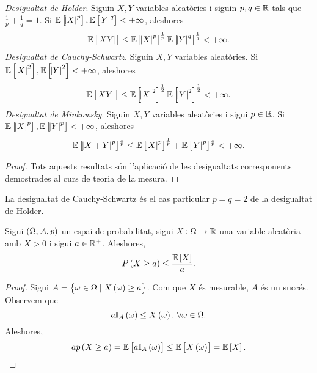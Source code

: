 \begin{prop}
    \textit{Desigualtat de Holder}. Siguin $X,Y$ variables aleatòries i siguin $p,q\in\mathbb{R}$ tals que $\frac{1}{p}+\frac{1}{q}=1$. Si $\operatorname{\mathbb{E}}\left[\abs{X}^p\right],\operatorname{\mathbb{E}}\left[\abs{Y}^q\right]<+\infty$, aleshores
    \[
        \operatorname{\mathbb{E}}\left[\abs{XY}\right]\leq\operatorname{\mathbb{E}}\left[\abs{X}^p\right]^{\frac{1}{p}}\operatorname{\mathbb{E}}\left[\abs{Y}^q\right]^{\frac{1}{q}}<+\infty.
    \]
    \textit{Desigualtat de Cauchy-Schwartz}. Siguin $X,Y$ variables aleatòries. Si $\operatorname{\mathbb{E}}\left[\abs{X}^2\right],\operatorname{\mathbb{E}}\left[\abs{Y}^2\right]<+\infty$, aleshores
    \[
        \operatorname{\mathbb{E}}\left[\abs{XY}\right]\leq\operatorname{\mathbb{E}}\left[\abs{X}^2\right]^{\frac{1}{2}}\operatorname{\mathbb{E}}\left[\abs{Y}^2\right]^{\frac{1}{2}}<+\infty.
    \]
    \textit{Desigualtat de Minkowsky}. Siguin $X,Y$ variables aleatòries i sigui $p\in\mathbb{R}$. Si $\operatorname{\mathbb{E}}\left[\abs{X}^p\right],\operatorname{\mathbb{E}}\left[\abs{Y}^p\right]<+\infty$, aleshores
    \[
        \operatorname{\mathbb{E}}\left[\abs{X+Y}^p\right]^{\frac{1}{p}}\leq\operatorname{\mathbb{E}}\left[\abs{X}^p\right]^{\frac{1}{p}}+\operatorname{\mathbb{E}}\left[\abs{Y}^p\right]^{\frac{1}{p}}<+\infty.
    \]
\end{prop}
\begin{proof}
    Tots aquests resultats són l'aplicació de les desigualtats corresponents demostrades al curs de teoria de la mesura.
\end{proof}
\begin{obs}
    La desigualtat de Cauchy-Schwartz és el cas particular $p=q=2$ de la desigualtat de Holder.
\end{obs}
\begin{specialteo}
    Sigui $\left(\Omega,\mathcal{A},p\right)$ un espai de probabilitat, sigui $X\colon\Omega\to\mathbb{R}$ una variable aleatòria amb $X>0$ i sigui $a\in\mathbb{R}^+$. Aleshores,
    \[
        P\left( X\geq a\right) \leq \frac{\operatorname{\mathbb{E}}\left[ X\right]}{a}.
    \]
\end{specialteo}
\begin{proof}
    Sigui $A=\left\{ \omega\in\Omega\mid X\left(\omega\right)\geq a\right\}$. Com que $X$ és mesurable, $A$ és un succés. Observem que
    \[
        a\mathbb{I}_A\left(\omega\right)\leq X\left(\omega\right),\,\forall\omega\in\Omega.
    \]
    Aleshores,
    \[
        ap\left( X\geq a\right) = \operatorname{\mathbb{E}}\left[ a\mathbb{I}_A\left(\omega\right)\right] \leq \operatorname{\mathbb{E}}\left[ X\left(\omega\right)\right] = \operatorname{\mathbb{E}}\left[ X\right].
    \]
\end{proof}




